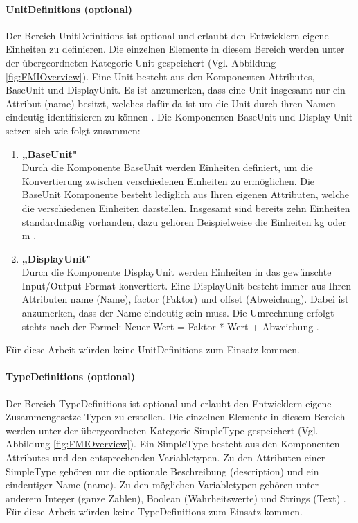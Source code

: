 \paragraph{UnitDefinitions (optional)}\label{sec:UnitDefinitions}
\noindent Der Bereich UnitDefinitions ist optional und erlaubt den Entwicklern eigene Einheiten zu definieren.  Die einzelnen Elemente in diesem Bereich werden unter der übergeordneten Kategorie Unit gespeichert (Vgl. Abbildung \ref{fig:FMIOverview}). Eine Unit besteht aus den Komponenten Attributes, BaseUnit und DisplayUnit. Es ist anzumerken, dass eine Unit insgesamt nur ein Attribut (name) besitzt, welches dafür da ist um die Unit durch ihren Namen eindeutig identifizieren zu können \cite[S.34]{25}. Die Komponenten BaseUnit und Display Unit setzen sich wie folgt zusammen:
\begin{enumerate}
	\item \textbf{„BaseUnit"} \cite[S.35]{25} \\
	Durch die Komponente BaseUnit werden Einheiten definiert, um die Konvertierung zwischen
	verschiedenen Einheiten zu ermöglichen. Die BaseUnit Komponente besteht lediglich aus 
	Ihren eigenen Attributen, welche die verschiedenen Einheiten darstellen. Insgesamt sind 
	bereits zehn Einheiten standardmäßig vorhanden, dazu gehören Beispielweise die Einheiten 
	kg oder m \cite[S.35]{25}.
	\item \textbf{„DisplayUnit"} \cite[S.38]{25} \\
	Durch die Komponente DisplayUnit werden Einheiten in das gewünschte Input/Output
	Format konvertiert. Eine DisplayUnit besteht immer aus Ihren Attributen name (Name), 
	factor (Faktor) und offset (Abweichung). Dabei ist anzumerken, dass der Name eindeutig sein 
	muss. Die Umrechnung erfolgt stehts nach der Formel: Neuer Wert = Faktor * Wert + 
	Abweichung \cite[S.38]{25}.
\end{enumerate}
Für diese Arbeit würden keine UnitDefinitions zum Einsatz kommen.
\paragraph{TypeDefinitions (optional)}\label{sec:TypeDefinitions}
\noindent Der Bereich TypeDefinitions ist optional und erlaubt den Entwicklern eigene Zusammengesetze Typen zu erstellen. Die einzelnen Elemente in diesem Bereich werden unter der übergeordneten Kategorie SimpleType gespeichert (Vgl. Abbildung \ref{fig:FMIOverview}). Ein SimpleType besteht aus den Komponenten Attributes und den entsprechenden Variabletypen. Zu den Attributen einer SimpleType gehören nur die optionale Beschreibung (description) und ein eindeutiger Name (name). Zu den möglichen Variabletypen gehören unter anderem Integer (ganze Zahlen), Boolean (Wahrheitswerte) und Strings (Text) \cite[S.39]{25}.
\newline
Für diese Arbeit würden keine TypeDefinitions zum Einsatz kommen.
